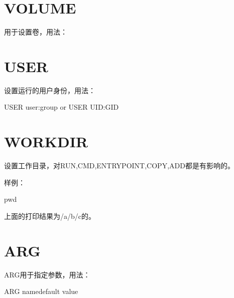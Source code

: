 \documentclass[letterpaper,10pt,english]{sphinxmanual}
\begin{document}
\section{VOLUME}
\label{\detokenize{_u8fd0_u884c_u5e94_u7528/05-dockerfile_u53c2_u8003:volume}}
用于设置卷，用法：

%
\begin{sphinxVerbatim}[commandchars=\\\{\}]
\end{sphinxVerbatim}


\section{USER}
\label{\detokenize{_u8fd0_u884c_u5e94_u7528/05-dockerfile_u53c2_u8003:user}}
设置运行的用户身份，用法：

%
\begin{sphinxVerbatim}[commandchars=\\\{\}]
USER \PYGZlt{}user\PYGZgt{}\PYG{o}{[}:\PYGZlt{}group\PYGZgt{}\PYG{o}{]} or
USER \PYGZlt{}UID\PYGZgt{}\PYG{o}{[}:\PYGZlt{}GID\PYGZgt{}\PYG{o}{]}
\end{sphinxVerbatim}


\section{WORKDIR}
\label{\detokenize{_u8fd0_u884c_u5e94_u7528/05-dockerfile_u53c2_u8003:workdir}}
设置工作目录，对RUN,CMD,ENTRYPOINT,COPY,ADD都是有影响的。

样例：

%
\begin{sphinxVerbatim}[commandchars=\\\{\}]
 pwd
\end{sphinxVerbatim}

上面的打印结果为/a/b/c的。


\section{ARG}
\label{\detokenize{_u8fd0_u884c_u5e94_u7528/05-dockerfile_u53c2_u8003:arg}}
ARG用于指定参数，用法：

%
\begin{sphinxVerbatim}[commandchars=\\\{\}]
ARG \PYGZlt{}name\PYGZgt{}\PYG{o}{[}\PYGZlt{}default value\PYGZgt{}\PYG{o}{]}
\end{sphinxVerbatim}
\end{document}
